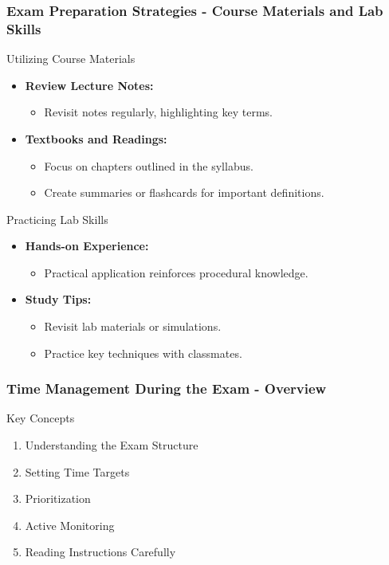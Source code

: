 \documentclass{beamer}
\begin{document}
\begin{frame}[fragile]
    \frametitle{Exam Preparation Strategies - Course Materials and Lab Skills}
    \begin{block}{Utilizing Course Materials}
        \begin{itemize}
            \item \textbf{Review Lecture Notes:}
                \begin{itemize}
                    \item Revisit notes regularly, highlighting key terms.
                \end{itemize}
            \item \textbf{Textbooks and Readings:}
                \begin{itemize}
                    \item Focus on chapters outlined in the syllabus.
                    \item Create summaries or flashcards for important definitions.
                \end{itemize}
        \end{itemize}
    \end{block}
    \begin{block}{Practicing Lab Skills}
        \begin{itemize}
            \item \textbf{Hands-on Experience:}
                \begin{itemize}
                    \item Practical application reinforces procedural knowledge.
                \end{itemize}
            \item \textbf{Study Tips:}
                \begin{itemize}
                    \item Revisit lab materials or simulations.
                    \item Practice key techniques with classmates.
                \end{itemize}
        \end{itemize}
    \end{block}
\end{frame}

\begin{frame}[fragile]
    \frametitle{Time Management During the Exam - Overview}
    
    \begin{block}{Key Concepts}
        \begin{enumerate}
            \item Understanding the Exam Structure
            \item Setting Time Targets
            \item Prioritization
            \item Active Monitoring
            \item Reading Instructions Carefully
        \end{enumerate}
    \end{block}
    
\end{frame}
\end{document}
